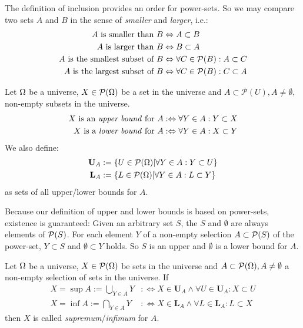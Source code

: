 The definition of inclusion provides an order for power-sets.
So we may compare two sets $A$ and $B$ in the sense of \emph{smaller} and \emph{larger}, i.e.:
\begin{align}
A \text{ is smaller than } B 
&\Leftrightarrow A \subset B
\\
A \text{ is larger than } B  
&\Leftrightarrow B \subset A
\\
A \text{ is the smallest subset of } B
&\Leftrightarrow \forall C \in \mathcal{P}(B) : A \subset C
\\
A \text{ is the largest subset of } B
&\Leftrightarrow \forall C \in \mathcal{P}(B) : C \subset A
\end{align}


\begin{definition}
Let $\Omega$ be a universe, $X \in \mathcal{P}(\Omega)$ be a set in the universe and $A \subset \mathcal{P}(U), A \neq \emptyset,$ non-empty subsets in the universe.
\begin{align}
X \text{ is an \emph{upper bound} for } A
&:\Leftrightarrow
\forall Y \in A : Y \subset X
\\
X \text{ is a \emph{lower bound} for } A
&:\Leftrightarrow
\forall Y \in A : X \subset Y
\end{align}
We also define:
\begin{align}
\mathbf{U}_A 
&:= \{ U \in \mathcal{P}(\Omega) | \forall Y \in A : Y \subset U \}
\\
\mathbf{L}_A
&:= \{ L \in \mathcal{P}(\Omega) | \forall Y \in A : L \subset Y \}
\end{align}
as sets of all upper/lower bounds for $A$.
\end{definition}

Because our definition of upper and lower bounds is based on power-sets, existence is guaranteed:
Given an arbitrary set $S$, the $S$ and $\emptyset$ are always elements of $\mathcal{P}(S)$.
For each element $Y$ of a non-empty selection $A \subset \mathcal{P}(S)$ of the power-set, $Y \subset S$ and $\emptyset \subset Y$ holds.
So $S$ is an upper and $\emptyset$ is a lower bound for $A$.

\begin{definition}
\label{definition:SupremumAndInfimum}
Let $\Omega$ be a universe, $X \in \mathcal{P}(\Omega)$ be sets in the universe and $A \subset \mathcal{P}(\Omega), A \neq \emptyset$ a non-empty selection of sets in the universe.
If
\begin{align}
X 
= \sup A
:= \bigcup\limits_{Y \in A} Y
&:\Leftrightarrow
X \in \mathbf{U}_A \wedge \forall U \in \mathbf{U}_A : X \subset U
\\
X
= \inf A
:= \bigcap\limits_{Y \in A} Y
&:\Leftrightarrow
X \in \mathbf{L}_A \wedge \forall L \in \mathbf{L}_A : L \subset X
\end{align}
then $X$ is called \emph{supremum}/\emph{infimum} for $A$.
\end{definition}

